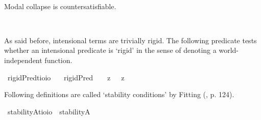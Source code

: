 \begin{isabellebody}
%
\ %
%
\isamarkupfalse%
\ %
%
%
%
%
\begin{isamarkuptext}%
Modal collapse is countersatisfiable.%
\end{isamarkuptext}\isamarkuptrue%
\isamarkupfalse%
\ {\isachardoublequoteopen}{\isasymlfloor}{\isasymphi}\ \isactrlbold {\isasymrightarrow}\ \isactrlbold {\isasymbox}{\isasymphi}{\isasymrfloor}{\isachardoublequoteclose}\ \isamarkupfalse%
%
\ %
%
\isamarkupfalse%
\ \ \ %
%
%
%
%
\isamarkuptrue%
%
\begin{isamarkuptext}%
As said before, intensional terms are trivially rigid. The following predicate tests whether an intensional
predicate is `rigid' in the sense of denoting a world-independent function.%
\end{isamarkuptext}\isamarkuptrue%
\isamarkupfalse%
\ rigidPred{\isacharcolon}{\isacharcolon}{\isachardoublequoteopen}{\isacharparenleft}{\isacharprime}t{\isasymRightarrow}io{\isacharparenright}{\isasymRightarrow}io{\isachardoublequoteclose}\ \isanewline
\ \ {\isachardoublequoteopen}rigidPred\ {\isasymtau}\ {\isasymequiv}\ {\isacharparenleft}{\isasymlambda}{\isasymbeta}{\isachardot}\ \isactrlbold {\isasymbox}{\isacharparenleft}{\isacharparenleft}{\isasymlambda}z{\isachardot}\ {\isasymbeta}\ \isactrlbold {\isasymapprox}\ z{\isacharparenright}\ \isactrlbold {\isasymdown}{\isasymtau}{\isacharparenright}{\isacharparenright}\ \isactrlbold {\isasymdown}{\isasymtau}{\isachardoublequoteclose}%
\begin{isamarkuptext}%
Following definitions are called `stability conditions' by Fitting (\cite{Fitting}, p. 124).%
\end{isamarkuptext}\isamarkuptrue%
\isamarkupfalse%
\ stabilityA{\isacharcolon}{\isacharcolon}{\isachardoublequoteopen}{\isacharparenleft}{\isacharprime}t{\isasymRightarrow}io{\isacharparenright}{\isasymRightarrow}io{\isachardoublequoteclose}\ \ {\isachardoublequoteopen}stabilityA\ {\isasymtau}\ {\isasymequiv}\ \isactrlbold {\isasymforall}{\isasymalpha}{\isachardot}\ {\isacharparenleft}{\isasymtau}\ {\isasymalpha}{\isacharparenright}\ \isactrlbold {\isasymrightarrow}\ \isactrlbold {\isasymbox}{\isacharparenleft}{\isasymtau}\ {\isasymalpha}{\isacharparenright}{\isachardoublequoteclose}\isanewline
{}\isamarkupfalse%

\end{isabellebody}
